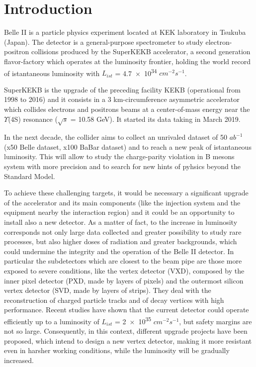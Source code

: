 

\chapter*{Introduction}

Belle II is a particle physics experiment located at KEK laboratory in Tsukuba (Japan). The detector is a general-purpose spectrometer to study electron-positron collisions produced by the SuperKEKB accelerator, a second generation flavor-factory which operates at the luminosity frontier, holding the world record of istantaneous luminosity with $L_{ist}$ = \num{4.7e34} $cm^{-2} s^{-1}$. 

SuperKEKB is the upgrade of the preceding facility KEKB (operational from 1998 to 2016) and it consists in a 3 km-circumference asymmetric accelerator which collides electrons and positrons beams at a center-of-mass energy near the $\Upsilon$(4S) resonance ($\sqrt{s}$ = 10.58 GeV). It started its data taking in March 2019.

In the next decade, the collider aims to collect  an unrivaled dataset of 50 $ab^{-1}$ (x50 Belle dataset, x100 BaBar dataset) and to reach a new peak of istantaneous luminosity. This will allow to study the charge-parity violation in B mesons system with more precision and to search for new hints of pyhsics beyond the Standard Model.

To achieve these challenging targets, it would be necessary a significant upgrade of the accelerator and its main components (like the injection system and the equipment nearby the interaction region) and it could be an opportunity to install also a new detector. As a matter of fact, to the increase in luminosity corresponds not only large data collected and greater possibility to study rare processes, but also higher doses of radiation and greater backgrounds, which could undermine the integrity and the operation of the Belle II detector.
In particular the subdetectors which are closest to the beam pipe are those more exposed to severe conditions, like the vertex detector (VXD), composed by the inner pixel detector (PXD, made by layers of pixels) and the outermost silicon vertex detector (SVD, made by layers of strips). They deal with the reconstruction of charged particle tracks and of decay vertices with high performance. Recent studies have shown that the current detector could operate efficiently up to a luminosity of $L_{ist}$ = \num{2e35} $cm^{-2} s^{-1}$, but safety margins are not so large. 
Consequently, in this context, different upgrade projects have been proposed, which intend to design a new vertex detector, making it more resistant even in harsher working conditions, while the luminosity will be gradually increased. 

